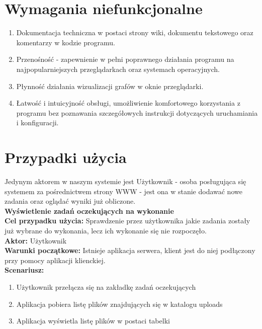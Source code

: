 \section{Wymagania niefunkcjonalne}

\begin{enumerate}
    \item Dokumentacja techniczna w postaci strony wiki, dokumentu tekstowego oraz komentarzy w kodzie programu.
    \item Przenośność - zapewnienie w pełni poprawnego działania programu na najpopularniejszych przeglądarkach oraz systemach operacyjnych.
    \item Płynność działania wizualizacji grafów w oknie przeglądarki.
    \item Łatwość i intuicyjność obsługi, umożliwienie komfortowego korzystania z programu bez poznawania szczegółowych instrukcji dotyczących uruchamiania i konfiguracji.
\end{enumerate}

\section{Przypadki użycia}

Jedynym aktorem w naszym systemie jest Użytkownik - osoba posługująca się systemem za pośrednictwem strony WWW - jest ona w stanie dodawać nowe zadania oraz oglądać wyniki już obliczone.\\

	\textbf{Wyświetlenie zadań oczekujących na wykonanie}\\
	\textbf{Cel przypadku użycia:} Sprawdzenie przez użytkownika jakie zadania zostały już wybrane do wykonania, lecz ich wykonanie się nie rozpoczęło.\\
	\textbf{Aktor:} Użytkownik\\
	\textbf{Warunki początkowe:} Istnieje aplikacja serwera, klient jest do niej podłączony przy pomocy aplikacji klienckiej.\\
	\textbf{Scenariusz:}
	\begin{enumerate}
	\item Użytkownik przełącza się na zakładkę zadań oczekujących
	\item Aplikacja pobiera listę plików znajdujących się w katalogu uploads
	\item  Aplikacja wyświetla listę plików w postaci tabelki\\\\
	\end{enumerate}

